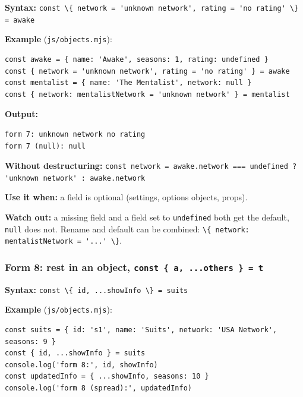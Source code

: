 \documentclass[
  10pt,
]{article}
\newcommand{\passthrough}[1]{#1}
\begin{document}
\textbf{Syntax:}
\passthrough{\lstinline!const \{ network = 'unknown network', rating = 'no rating' \} = awake!}

\textbf{Example} (\passthrough{\lstinline!js/objects.mjs!}):

\begin{lstlisting}
const awake = { name: 'Awake', seasons: 1, rating: undefined }
const { network = 'unknown network', rating = 'no rating' } = awake
const mentalist = { name: 'The Mentalist', network: null }
const { network: mentalistNetwork = 'unknown network' } = mentalist
\end{lstlisting}

\textbf{Output:}

\begin{lstlisting}
form 7: unknown network no rating
form 7 (null): null
\end{lstlisting}

\textbf{Without destructuring:}
\passthrough{\lstinline!const network = awake.network === undefined ? 'unknown network' : awake.network!}

\textbf{Use it when:} a field is optional (settings, options objects,
props).

\textbf{Watch out:} a missing field and a field set to
\passthrough{\lstinline!undefined!} both get the default,
\passthrough{\lstinline!null!} does not. Rename and default can be
combined:
\passthrough{\lstinline!\{ network: mentalistNetwork = '...' \}!}.

\hypertarget{form-8-rest-in-an-object-const-a-...others-t}{%
\subsubsection{\texorpdfstring{Form 8: rest in an object,
\texttt{const\ \{\ a,\ ...others\ \}\ =\ t}}{Form 8: rest in an object, const \{ a, ...others \} = t}}\label{form-8-rest-in-an-object-const-a-...others-t}}

\textbf{Syntax:}
\passthrough{\lstinline!const \{ id, ...showInfo \} = suits!}

\textbf{Example} (\passthrough{\lstinline!js/objects.mjs!}):

\begin{lstlisting}
const suits = { id: 's1', name: 'Suits', network: 'USA Network', seasons: 9 }
const { id, ...showInfo } = suits
console.log('form 8:', id, showInfo)
const updatedInfo = { ...showInfo, seasons: 10 }
console.log('form 8 (spread):', updatedInfo)
\end{lstlisting}
\end{document}
